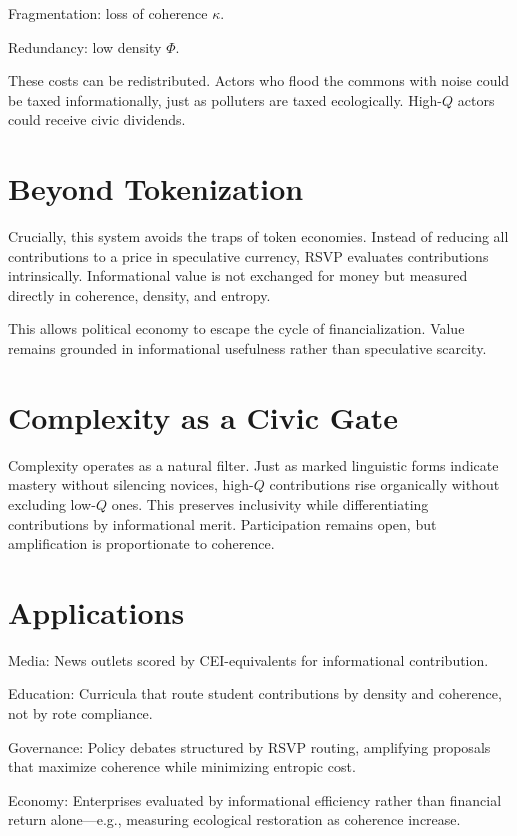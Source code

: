 \documentclass{book}
\begin{document}
Fragmentation: loss of coherence \( \kappa \).

Redundancy: low density \( \Phi \).

These costs can be redistributed. Actors who flood the commons with noise could be taxed informationally, just as polluters are taxed ecologically. High-\( Q \) actors could receive civic dividends.

\section{Beyond Tokenization}

Crucially, this system avoids the traps of token economies. Instead of reducing all contributions to a price in speculative currency, RSVP evaluates contributions intrinsically. Informational value is not exchanged for money but measured directly in coherence, density, and entropy.

This allows political economy to escape the cycle of financialization. Value remains grounded in informational usefulness rather than speculative scarcity.

\section{Complexity as a Civic Gate}

Complexity operates as a natural filter. Just as marked linguistic forms indicate mastery without silencing novices, high-\( Q \) contributions rise organically without excluding low-\( Q \) ones. This preserves inclusivity while differentiating contributions by informational merit. Participation remains open, but amplification is proportionate to coherence.

\section{Applications}

Media: News outlets scored by CEI-equivalents for informational contribution.

Education: Curricula that route student contributions by density and coherence, not by rote compliance.

Governance: Policy debates structured by RSVP routing, amplifying proposals that maximize coherence while minimizing entropic cost.

Economy: Enterprises evaluated by informational efficiency rather than financial return alone—e.g., measuring ecological restoration as coherence increase.
\end{document}
